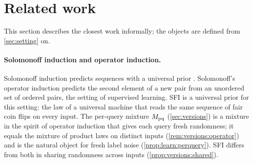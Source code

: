 \section{Related work}\label{sec:related}

This section describes the closest work informally; the objects are defined from \cref{sec:setting} on.

\paragraph{Solomonoff induction and operator induction.} Solomonoff induction predicts sequences with a universal prior \citep{solomonoff1978complexity,li2008introduction}. Solomonoff's operator induction \citep{solomonoff2008three} predicts the second element of a new pair from an unordered set of ordered pairs, the setting of supervised learning. SFI is a universal prior for this setting: the law of a universal machine that reads the same sequence of fair coin flips on every input. The per-query mixture $M_{\mathrm{pq}}$ (\cref{sec:versions}) is a mixture in the spirit of operator induction that gives each query fresh randomness; it equals the mixture of product laws on distinct inputs (\cref{rem:versions:operator}) and is the natural object for fresh label noise (\cref{prop:learn:perquery}). SFI differs from both in sharing randomness across inputs (\cref{prop:versions:shared}).


